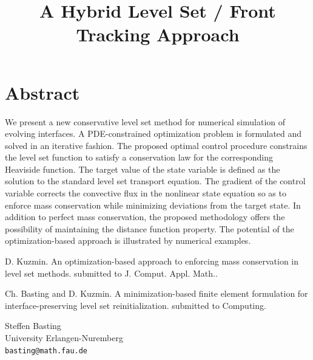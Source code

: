 \documentclass[article, A4, 11pt]{llncs}%
\begin{document}
\section*{Abstract}
We present a new conservative level set method for numerical simulation of evolving  interfaces. A PDE-constrained optimization problem is formulated and solved in an iterative fashion. The proposed optimal control procedure constrains the level set function to satisfy a conservation law for the corresponding Heaviside function. The target value of the state variable is defined as the solution to the standard level set transport equation. The gradient of the control variable corrects the convective flux in the nonlinear state equation so as to enforce mass conservation while minimizing deviations from the target state. In addition to perfect mass conservation, the proposed methodology offers the possibility of maintaining the distance function property. The potential of the optimization-based approach is illustrated by numerical examples.


\begin{thebibliography}{10}
{\sc D. Kuzmin}. {An optimization-based approach to enforcing mass conservation in level set methods}. submitted to J. Comput. Appl. Math..

{\sc Ch. Basting and D. Kuzmin}. {A minimization-based finite element formulation for interface-preserving level set reinitialization}. submitted to Computing.
\end{thebibliography} %

\title{A Hybrid Level Set / Front Tracking Approach}
 \author{} \institute{}
\maketitle
\begin{center}
{\large Steffen Basting}\\
University Erlangen-Nuremberg\\
{\tt basting@math.fau.de}
\end{center}
\end{document}
